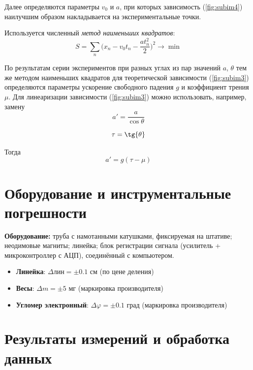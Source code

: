 \documentclass[
	a4paper, %
	12pt, %
]{article}
\begin{document}
	Далее определяются параметры $v_0$ и $a$, при которых зависимость (\ref{fig:subim4}) наилучшим образом накладывается на экспериментальные точки.
	
	Используется численный \textit{метод наименьших квадратов}:
	\begin{equation}
		S = \sum_{n}\big(x_n - v_{0}t_{n} - \frac{at_{n}^{2}}{2}\big)^2 \rightarrow \min
	\end{equation}
	
	По результатам серии экспериментов при разных углах из пар значений {$a$, $\theta$} тем же методом наименьших квадратов для теоретической зависимости (\ref{fig:subim3}) определяются параметры ускорение свободного падения $g$ и коэффициент трения $\mu$.
	Для линеаризации зависимости (\ref{fig:subim3}) можно использовать, например, замену
	\begin{equation}
		a' = \frac{a}{\cos{\theta}}
	\end{equation}
	
	\begin{equation}
		\tau = \tg{\theta}
	\end{equation}
	
	Тогда
	\begin{equation}
		a' = g(\tau - \mu)
	\end{equation}
	
	\section{Оборудование и инструментальные погрешности}
	\textbf{Оборудование:} труба с намотанными катушками, фиксируемая на штативе; неодимовые магниты; линейка; блок регистрации сигнала (усилитель + микроконтроллер с АЦП), соединённый с компьютером.
	\begin{itemize}
		\item \textbf{Линейка}: $\Delta \text{лин} = \pm0.1$ см (по цене деления)
		\item \textbf{Весы}: $\Delta m = \pm{5}$ мг (маркировка производителя)
		\item \textbf{Угломер электронный}: $\Delta \varphi = \pm{0.1}$ град (маркировка производителя)
	\end{itemize}
	
	\newpage
	
	\section{Результаты измерений и обработка данных}
	
\end{document}
